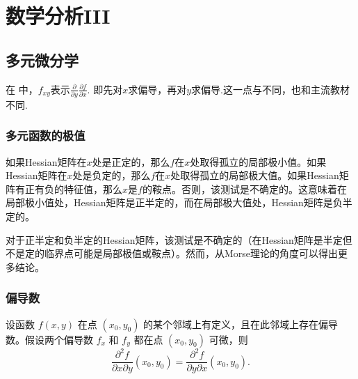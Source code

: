 \setchapterpreamble[u]{\margintoc}
\chapter{数学分析III}

\section{多元微分学}

在\cite{邓东皋} 中，$f_{xy}$表示$\frac{\partial}{\partial y}\frac{\partial f}{\partial x}$. 即先对$x$求偏导，再对$y$求偏导.这一点与\cite{崔尚斌}不同，也和主流教材不同.

\subsection{多元函数的极值}

\begin{theorem}[Hessian判别法]\label{thm:hessian-discrimination}
    如果Hessian矩阵在$x$处是正定的，那么$f$在$x$处取得孤立的局部极小值。如果Hessian矩阵在$x$处是负定的，那么$f$在$x$处取得孤立的局部极大值。如果Hessian矩阵有正有负的特征值，那么$x$是$f$的鞍点。否则，该测试是不确定的。这意味着在局部极小值处，Hessian矩阵是正半定的，而在局部极大值处，Hessian矩阵是负半定的。

    对于正半定和负半定的Hessian矩阵，该测试是不确定的（在Hessian矩阵是半定但不是定的临界点可能是局部极值或鞍点）。然而，从Morse理论的角度可以得出更多结论。
\end{theorem}

\subsection{偏导数}
\begin{theorem}[杨定理]
    设函数 $f(x, y)$ 在点 $\left(x_0, y_0\right)$ 的某个邻域上有定义，且在此邻域上存在偏导数。假设两个偏导数 $f_x$ 和 $f_y$ 都在点 $\left(x_0, y_0\right)$ 可微，则
$$
\frac{\partial^2 f}{\partial x \partial y}\left(x_0, y_0\right)=\frac{\partial^2 f}{\partial y \partial x}\left(x_0, y_0\right) .
$$
\end{theorem}

